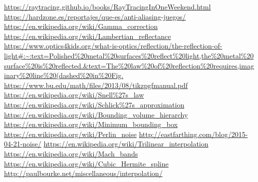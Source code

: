 \documentclass[12pt]{article}
\theoremstyle{definition}
\theoremstyle{remark}
\begin{document}
\begin{thebibliography}{9}
\url{https://raytracing.github.io/books/RayTracingInOneWeekend.html}
\url{https://hardzone.es/reportajes/que-es/anti-aliasing-juegos/}
\url{https://en.wikipedia.org/wiki/Gamma_correction}
\url{https://en.wikipedia.org/wiki/Lambertian_reflectance}
\url{https://www.optics4kids.org/what-is-optics/reflection/the-reflection-of-light#:~:text=Polished%20metal%20surfaces%20reflect%20light,the%20metal%20surface%20is%20reflected.&text=The%20law%20of%20reflection%20requires,imaginary%20line%20(dashed%20in%20Fig.}
\url{https://www.bu.edu/math/files/2013/08/tikzpgfmanual.pdf}
\url{https://en.wikipedia.org/wiki/Snell%27s_law}
\url{https://en.wikipedia.org/wiki/Schlick%27s_approximation}
\url{https://en.wikipedia.org/wiki/Bounding_volume_hierarchy}
\url{https://en.wikipedia.org/wiki/Minimum_bounding_box}
\url{https://en.wikipedia.org/wiki/Perlin_noise}
\url{http://eastfarthing.com/blog/2015-04-21-noise/}
\url{https://en.wikipedia.org/wiki/Trilinear_interpolation}
\url{https://en.wikipedia.org/wiki/Mach_bands}
\url{https://en.wikipedia.org/wiki/Cubic_Hermite_spline}
\url{http://paulbourke.net/miscellaneous/interpolation/}
\end{thebibliography}
\end{document}
